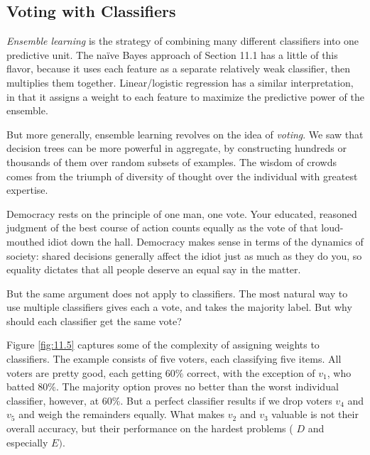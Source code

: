 \documentclass[10pt]{article}
\begin{document}
\begin{enumerate}
\subsection*{Voting with Classifiers}
\textit{Ensemble learning} is the strategy of combining many different classifiers into one predictive unit. The naïve Bayes approach of Section 11.1 has a little of this flavor, because it uses each feature as a separate relatively weak classifier, then multiplies them together. Linear/logistic regression has a similar interpretation, in that it assigns a weight to each feature to maximize the predictive power of the ensemble.

But more generally, ensemble learning revolves on the idea of \textit{voting}. We saw that decision trees can be more powerful in aggregate, by constructing hundreds or thousands of them over random subsets of examples. The wisdom of crowds comes from the triumph of diversity of thought over the individual with greatest expertise.

Democracy rests on the principle of one man, one vote. Your educated, reasoned judgment of the best course of action counts equally as the vote of that loud-mouthed idiot down the hall. Democracy makes sense in terms of the dynamics of society: shared decisions generally affect the idiot just as much as they do you, so equality dictates that all people deserve an equal say in the matter.

But the same argument does not apply to classifiers. The most natural way to use multiple classifiers gives each a vote, and takes the majority label. But why should each classifier get the same vote?

Figure \ref{fig:11.5} captures some of the complexity of assigning weights to classifiers. The example consists of five voters, each classifying five items. All voters are pretty good, each getting $60 \%$ correct, with the exception of $v_{1}$, who batted $80\%$. The majority option proves no better than the worst individual classifier, however, at $60 \%$. But a perfect classifier results if we drop voters $v_{4}$ and $v_{5}$ and weigh the remainders equally. What makes $v_{2}$ and $v_{3}$ valuable is not their overall accuracy, but their performance on the hardest problems ( $D$ and especially $E)$.


\end{enumerate}
\end{document}
